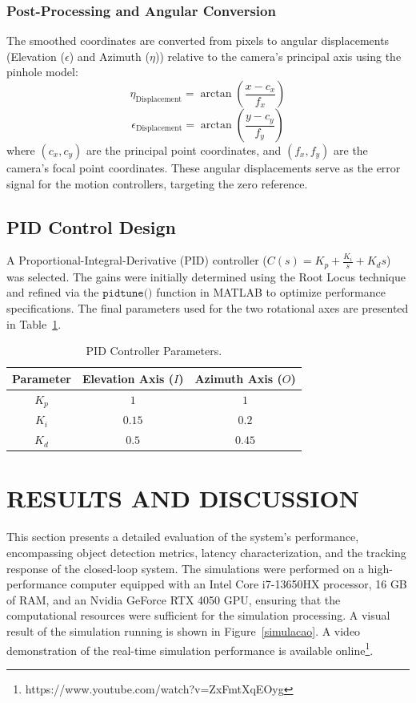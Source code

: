 \documentclass[conference]{IEEEtran}
\begin{document}
\subsubsection{Post-Processing and Angular Conversion}
The smoothed coordinates are converted from pixels to angular displacements (Elevation ($\epsilon$) and Azimuth ($\eta$)) relative to the camera's principal axis using the pinhole model:
\begin{equation}
    \eta_{\text{Displacement}} = \arctan\left(\frac{x - c_x}{f_x}\right)
\end{equation}
\begin{equation}
    \epsilon_{\text{Displacement}} = \arctan\left(\frac{y - c_y}{f_y}\right)
\end{equation}
where $(c_x, c_y)$ are the principal point coordinates, and $(f_x, f_y)$ are the camera's focal point coordinates. These angular displacements serve as the error signal for the motion controllers, targeting the zero reference.

\subsection{PID Control Design}
A Proportional-Integral-Derivative (PID) controller ($C(s) = K_p + \frac{K_i}{s} + K_d s$) was selected. The gains were initially determined using the Root Locus technique and refined via the $\texttt{pidtune()}$ function in MATLAB to optimize performance specifications. The final parameters used for the two rotational axes are presented in Table~\ref{PID parameters table}.

\begin{table}[!b]
\caption{PID Controller Parameters.}
\label{PID parameters table}
\centering
\begin{tabular}{|c||c|c|} 
    \hline
    \textbf{Parameter} & \textbf{Elevation Axis ($I$)} & \textbf{Azimuth Axis ($O$)} \\ [0.5ex] 
    \hline\hline
    $K_p$ & $1$ & $1$ \\ 
    \hline
    $K_i$ & $0.15$ & $0.2$ \\
    \hline
    $K_d$ & $0.5$ & $0.45$ \\
    \hline
\end{tabular}
\end{table}

\section{RESULTS AND DISCUSSION}
This section presents a detailed evaluation of the system's performance, encompassing object detection metrics, latency characterization, and the tracking response of the closed-loop system. The simulations were performed on a high-performance computer equipped with an Intel Core i7-13650HX processor, 16 GB of RAM, and an Nvidia GeForce RTX 4050 GPU, ensuring that the computational resources were sufficient for the simulation processing. A visual result of the simulation running is shown in Figure~\ref{simulacao}. A video demonstration of the real-time simulation performance is available online\footnote{https://www.youtube.com/watch?v=ZxFmtXqEOyg}. 
\end{document}

